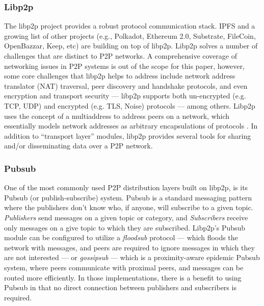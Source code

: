 \documentclass{textile}
\begin{document}
\subsubsection{Libp2p}

The libp2p project provides a robust protocol communication stack. IPFS and a growing list of other projects (e.g., Polkadot, Ethereum 2.0, Substrate, FileCoin, OpenBazzar, Keep, etc) are building on top of libp2p. Libp2p solves a number of challenges that are distinct to P2P networks. A comprehensive coverage of networking issues in P2P systems is out of the scope for this paper, however, some core challenges that libp2p helps to address include network address translator \cite{srisureshIPNetworkAddress} (NAT) traversal, peer discovery and handshake protocols, and even encryption and transport security --- libp2p supports both un-encrypted (e.g. TCP, UDP) and encrypted (e.g. TLS, Noise) protocols --- among others. Libp2p uses the concept of a multiaddress to address peers on a network, which essentially models network addresses as arbitrary encapsulations of protocols \cite{protocollabsMultiaddr}. In addition to ``transport layer'' modules, libp2p provides several tools for sharing and/or disseminating data over a P2P network.

\subsubsection{Pubsub}

One of the most commonly used P2P distribution layers built on libp2p, is its Pubsub (or publish-subscribe) system. Pubsub is a standard messaging pattern where the publishers don't know who, if anyone, will subscribe to a given topic. \emph{Publishers} send messages on a given topic or category, and \emph{Subscribers} receive only messages on a give topic to which they are subscribed. Libp2p's Pubsub module can be configured to utilize a \emph{floodsub} protocol --- which floods the network with messages, and peers are required to ignore messages in which they are not interested --- or \emph{gossipsub} --- which is a proximity-aware epidemic Pubsub system, where peers communicate with proximal peers, and messages can be routed more efficiently. In those implementations, there is a benefit to using Pubsub in that no direct connection between publishers and subscribers is required.
\end{document}
